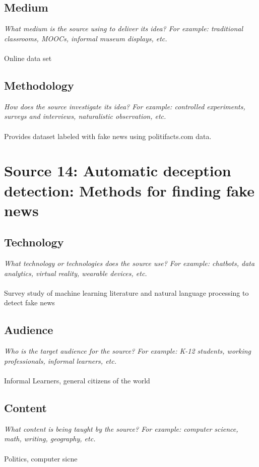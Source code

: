 \documentclass[12pt, final]{article}
\begin{document}
\subsection{Medium}
\textit{What medium is the source using to deliver its idea? For example: traditional classrooms, MOOCs, informal museum displays, etc.}
\\
\\
Online data set

\subsection{Methodology}
\textit{How does the source investigate its idea? For example: controlled experiments, surveys and interviews, naturalistic observation, etc.}
\\
\\
Provides dataset labeled with fake news using politifacts.com data.

\section{Source 14: Automatic deception detection: Methods for finding fake news}
\label{Source 14}

\subsection{Technology}
\textit{What technology or technologies does the source use? For example: chatbots, data analytics, virtual reality, wearable devices, etc.}
\\
\\
Survey study of machine learning literature and natural language processing to detect fake news

\subsection{Audience}
\textit{Who is the target audience for the source? For example: K-12 students, working professionals, informal learners, etc.}
\\
\\
Informal Learners, general citizens of the world

\subsection{Content}
\textit{What content is being taught by the source? For example: computer science, math, writing, geography, etc.}
\\
\\
Politics, computer sicne
\end{document}
